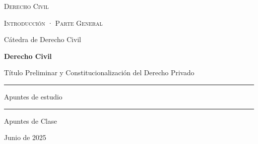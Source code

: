 \documentclass[12pt,oneside]{book}
\newcommand{\universidad}{Derecho Civil}
\newcommand{\facultad}{Introducción · Parte General}
\newcommand{\departamento}{Cátedra de Derecho Civil}
\newcommand{\materia}{Derecho Civil}
\newcommand{\titulo}{Título Preliminar y Constitucionalización del Derecho Privado}
\newcommand{\autor}{Apuntes de Clase}
\newcommand{\anio}{2025}
\begin{document}

\begin{titlepage}

\thispagestyle{empty}

\begin{center}

\vspace*{1cm}

\vspace{1cm}

{\large \textsc{\universidad}}

\vspace{0.2cm}

{\large \textsc{\facultad}}

\vspace{0.2cm}

{\large \departamento}

\vspace{3cm}

{\Huge \textbf{\materia}}

\vspace{1cm}

{\LARGE \titulo}

\vspace{1.5cm}

\rule{0.70\textwidth}{0.5pt}

\vspace{0.5cm}

{\large Apuntes de estudio}

\vspace{0.5cm}

\rule{0.70\textwidth}{0.5pt}

\vfill

{\large \autor}

\vspace{0.3cm}

{\large Junio de \anio}

\end{center}

\end{titlepage}


\tableofcontents

\clearpage

\end{document}
